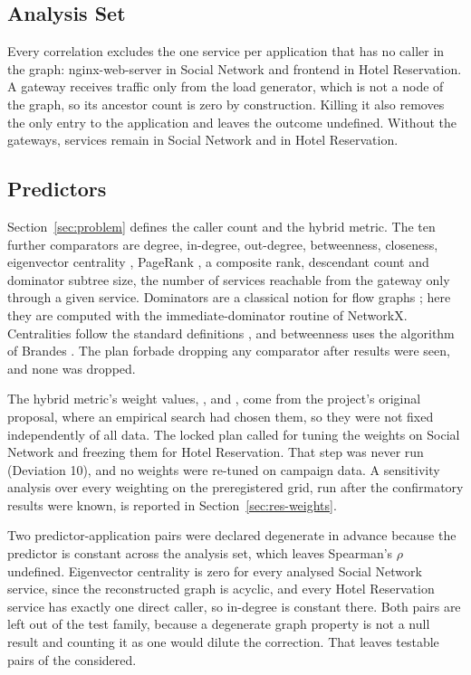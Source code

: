 \subsection{Analysis Set}
\label{sec:analysis-set}

Every correlation excludes the one service per application that has no caller in the graph:
nginx-web-server in Social Network and frontend in Hotel Reservation. A gateway receives
traffic only from the load generator, which is not a node of the graph, so its ancestor count
is zero by construction. Killing it also removes the only entry to the application and leaves
the outcome undefined. Without the gateways,  services remain in Social
Network and  in Hotel Reservation.

\subsection{Predictors}
\label{sec:predictors}

Section~\ref{sec:problem} defines the caller count and the hybrid metric. The ten further
comparators are degree, in-degree, out-degree, betweenness, closeness, eigenvector centrality
\cite{bonacich1987}, PageRank \cite{brin1998}, a composite rank, descendant count and dominator
subtree size, the number of services reachable from the gateway only through a given service.
Dominators are a classical notion for flow graphs \cite{lengauer1979}; here they are computed
with the immediate-dominator routine of NetworkX. Centralities follow the standard definitions
\cite{freeman1978}, and betweenness uses the algorithm of Brandes \cite{brandes2001}. The plan
forbade dropping any comparator after results were seen, and none was dropped.

The hybrid metric's weight values, ,  and
, come from the project's original proposal, where an empirical search had
chosen them, so they were not fixed independently of all data. The locked plan called for tuning the weights on Social Network and
freezing them for Hotel Reservation. That step was never run (Deviation 10), and no weights were
re-tuned on campaign data. %
A sensitivity analysis over every weighting on the preregistered grid, run after the
confirmatory results were known, is reported in Section~\ref{sec:res-weights}.

Two predictor-application pairs were declared degenerate in advance because the predictor is
constant across the analysis set, which leaves Spearman's $\rho$ undefined. Eigenvector
centrality is zero for every analysed Social Network service, %
since the reconstructed graph is acyclic, and every Hotel Reservation service has exactly one
direct caller, so in-degree is constant there. Both pairs are left out of the test family,
because a degenerate graph property is not a null result and counting it as one would dilute
the correction. That leaves  testable pairs of the
 considered.

